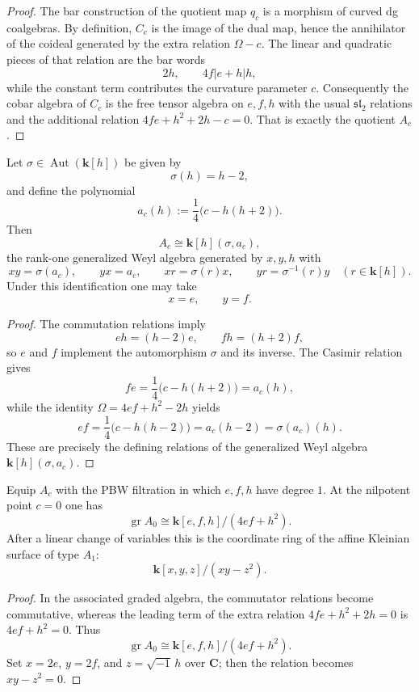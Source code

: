 \begin{proof}
The bar construction of the quotient map $q_c$ is a morphism of curved dg
coalgebras. By definition, $C_c$ is the image of the dual map, hence the
annihilator of the coideal generated by the extra relation $\Omega-c$. The
linear and quadratic pieces of that relation are the bar words
\[
2h,
\qquad
4f|e+h|h,
\]
while the constant term contributes the curvature parameter $c$.
Consequently the cobar algebra of $C_c$ is the free tensor algebra on $e,f,h$
with the usual $\mathfrak{sl}_2$ relations and the additional relation
$4fe+h^2+2h-c=0$. That is exactly the quotient $A_c$.
\end{proof}

\begin{corollary}
\label{cor:generalized-weyl-normal-form}
Let $\sigma\in \operatorname{Aut}(\mathbf{k}[h])$ be given by
\[
\sigma(h)=h-2,
\]
and define the polynomial
\[
a_c(h):=\frac{1}{4}\bigl(c-h(h+2)\bigr).
\]
Then
\[
A_c\cong \mathbf{k}[h](\sigma,a_c),
\]
the rank-one generalized Weyl algebra generated by $x,y,h$ with
\[
xy=\sigma(a_c),
\qquad yx=a_c,
\qquad xr=\sigma(r)x,
\qquad yr=\sigma^{-1}(r)y
\quad (r\in\mathbf{k}[h]).
\]
Under this identification one may take
\[
x=e,
\qquad y=f.
\]
\end{corollary}

\begin{proof}
The commutation relations imply
\[
eh=(h-2)e,
\qquad fh=(h+2)f,
\]
so $e$ and $f$ implement the automorphism $\sigma$ and its inverse. The Casimir
relation gives
\[
fe=\frac{1}{4}\bigl(c-h(h+2)\bigr)=a_c(h),
\]
while the identity $\Omega=4ef+h^2-2h$ yields
\[
ef=\frac{1}{4}\bigl(c-h(h-2)\bigr)=a_c(h-2)=\sigma(a_c)(h).
\]
These are precisely the defining relations of the generalized Weyl algebra
$\mathbf{k}[h](\sigma,a_c)$.
\end{proof}

\begin{corollary}
\label{cor:kleinian-associated-graded}
Equip $A_c$ with the PBW filtration in which $e,f,h$ have degree $1$. At the
nilpotent point $c=0$ one has
\[
\operatorname{gr}A_0
\cong
\mathbf{k}[e,f,h]/(4ef+h^2).
\]
After a linear change of variables this is the coordinate ring of the affine
Kleinian surface of type $A_1$:
\[
\mathbf{k}[x,y,z]/(xy-z^2).
\]
\end{corollary}

\begin{proof}
In the associated graded algebra, the commutator relations become commutative,
whereas the leading term of the extra relation $4fe+h^2+2h=0$ is
$4ef+h^2=0$. Thus
\[
\operatorname{gr}A_0\cong \mathbf{k}[e,f,h]/(4ef+h^2).
\]
Set $x=2e$, $y=2f$, and $z=\sqrt{-1}\,h$ over $\mathbf{C}$; then the relation
becomes $xy-z^2=0$.
\end{proof}

